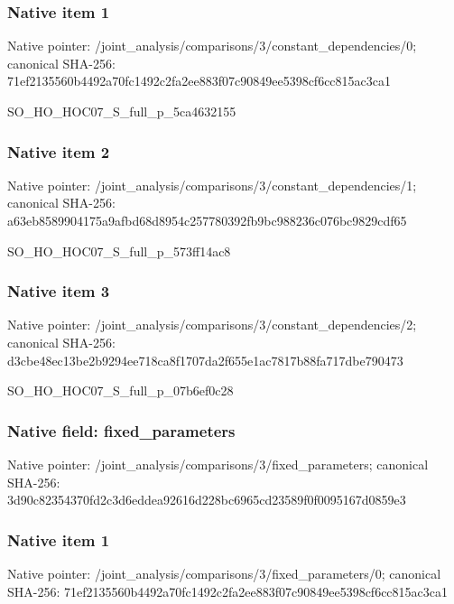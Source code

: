 \documentclass[10pt,a4paper]{article}
\begin{document}
\subsubsection{Native item 1}
Native pointer: /joint\_\allowbreak{}analysis/comparisons/3/constant\_\allowbreak{}dependencies/0; canonical SHA-256: 71ef2135560b4492a70fc1492c2fa2ee883f07c90849ee5398cf6cc815ac3ca1

\begingroup\raggedright\sloppy SO\_\allowbreak{}HO\_\allowbreak{}HOC07\_\allowbreak{}S\_\allowbreak{}full\_\allowbreak{}p\_\allowbreak{}5ca4632155\par\endgroup

\subsubsection{Native item 2}
Native pointer: /joint\_\allowbreak{}analysis/comparisons/3/constant\_\allowbreak{}dependencies/1; canonical SHA-256: a63eb8589904175a9afbd68d8954c257780392fb9bc988236c076bc9829cdf65

\begingroup\raggedright\sloppy SO\_\allowbreak{}HO\_\allowbreak{}HOC07\_\allowbreak{}S\_\allowbreak{}full\_\allowbreak{}p\_\allowbreak{}573ff14ac8\par\endgroup

\subsubsection{Native item 3}
Native pointer: /joint\_\allowbreak{}analysis/comparisons/3/constant\_\allowbreak{}dependencies/2; canonical SHA-256: d3cbe48ec13be2b9294ee718ca8f1707da2f655e1ac7817b88fa717dbe790473

\begingroup\raggedright\sloppy SO\_\allowbreak{}HO\_\allowbreak{}HOC07\_\allowbreak{}S\_\allowbreak{}full\_\allowbreak{}p\_\allowbreak{}07b6ef0c28\par\endgroup

\subsubsection{Native field: fixed\_\allowbreak{}parameters}
Native pointer: /joint\_\allowbreak{}analysis/comparisons/3/fixed\_\allowbreak{}parameters; canonical SHA-256: 3d90c82354370fd2c3d6eddea92616d228bc6965cd23589f0f0095167d0859e3

\subsubsection{Native item 1}
Native pointer: /joint\_\allowbreak{}analysis/comparisons/3/fixed\_\allowbreak{}parameters/0; canonical SHA-256: 71ef2135560b4492a70fc1492c2fa2ee883f07c90849ee5398cf6cc815ac3ca1
\end{document}
